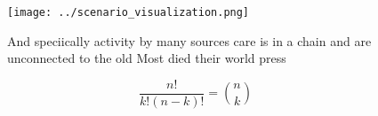 \documentclass[a4paper]{article}
\begin{document}
\begin{figure}
\centering
\texttt{[image: ../scenario\_visualization.png]}
\caption{And speciically activity by many sources care is in a chain and are unconnected to the old Most died their world press 
}
\end{figure}
 
\[ \frac{n!}{k!(n-k)!} = \binom{n}{k} \]
\end{document}
